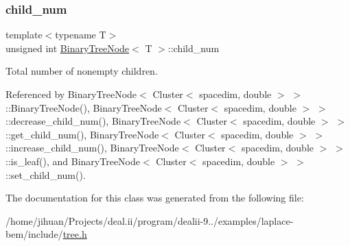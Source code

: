 \subsubsection{\texorpdfstring{child\+\_\+num}{child\_num}}
{\footnotesize\ttfamily template$<$typename T$>$ \\
unsigned int \hyperlink{classBinaryTreeNode}{Binary\+Tree\+Node}$<$ T $>$\+::child\+\_\+num\hspace{0.3cm}{\ttfamily [private]}}

Total number of nonempty children. 

Referenced by Binary\+Tree\+Node$<$ Cluster$<$ spacedim, double $>$ $>$\+::\+Binary\+Tree\+Node(), Binary\+Tree\+Node$<$ Cluster$<$ spacedim, double $>$ $>$\+::decrease\+\_\+child\+\_\+num(), Binary\+Tree\+Node$<$ Cluster$<$ spacedim, double $>$ $>$\+::get\+\_\+child\+\_\+num(), Binary\+Tree\+Node$<$ Cluster$<$ spacedim, double $>$ $>$\+::increase\+\_\+child\+\_\+num(), Binary\+Tree\+Node$<$ Cluster$<$ spacedim, double $>$ $>$\+::is\+\_\+leaf(), and Binary\+Tree\+Node$<$ Cluster$<$ spacedim, double $>$ $>$\+::set\+\_\+child\+\_\+num().



The documentation for this class was generated from the following file\+:\begin{DoxyCompactItemize}
\item 
/home/jihuan/\+Projects/deal.\+ii/program/dealii-\/9../examples/laplace-\/bem/include/\hyperlink{tree_8h}{tree.\+h}\end{DoxyCompactItemize}
